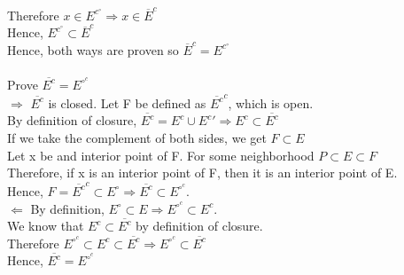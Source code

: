\documentclass{article}
\begin{document}
 \\Therefore $x \in E^c^\circ \Rightarrow x \in \overline{E}^c$
 \\Hence, $E^c^\circ \subset \overline{E}^c$
 \\Hence, both ways are proven so $\overline{E}^c = E^c^\circ$
 \\
 \\Prove $\overline{E^c} = E^\circ^c$
\\ $\Rightarrow$ $\overline{E^c}$ is closed. Let F be defined as $\overline{E^c}^c$, which is open. 
 \\By definition of closure, $\overline{E^c} = E^c \cup E^c' \Rightarrow E^c \subset \overline{E^c}$
 \\If we take the complement of both sides, we get $F \subset E$
 \\Let x be and interior point of F. For some neighborhood $P \subset E \subset F$
 \\Therefore, if x is an interior point of F, then it is an interior point of E.
 \\Hence, $F = \overline{E^c}^c \subset E^\circ \Rightarrow \overline{E^c} \subset E^\circ^c$.
 \\$\Leftarrow$ By definition, $E^\circ \subset E \Rightarrow E^\circ^c \subset E^c$.
 \\We know that $E^c \subset \overline{E^c}$ by definition of closure.
 \\Therefore $E^\circ^c \subset E^c \subset \overline{E^c} \Rightarrow E^\circ^c \subset \overline{E^c}$
 \\Hence, $\overline{E^c} = E^\circ^c$
\end{document}

